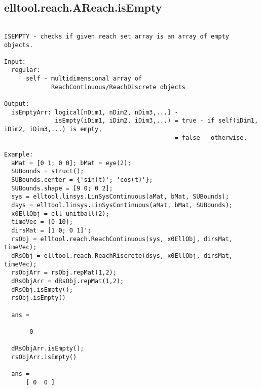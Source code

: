 \subsection{\texorpdfstring{elltool.reach.AReach.isEmpty}{isEmpty}}\label{method:elltool.reach.AReach.isEmpty}
\begin{verbatim}

ISEMPTY - checks if given reach set array is an array of empty objects.

Input:
  regular:
      self - multidimensional array of
             ReachContinuous/ReachDiscrete objects

Output:
  isEmptyArr: logical[nDim1, nDim2, nDim3,...] -
              isEmpty(iDim1, iDim2, iDim3,...) = true - if self(iDim1, iDim2, iDim3,...) is empty,
                                               = false - otherwise.

Example:
  aMat = [0 1; 0 0]; bMat = eye(2);
  SUBounds = struct();
  SUBounds.center = {'sin(t)'; 'cos(t)'};
  SUBounds.shape = [9 0; 0 2];
  sys = elltool.linsys.LinSysContinuous(aMat, bMat, SUBounds);
  dsys = elltool.linsys.LinSysContinuous(aMat, bMat, SUBounds);
  x0EllObj = ell_unitball(2);
  timeVec = [0 10];
  dirsMat = [1 0; 0 1]';
  rsObj = elltool.reach.ReachContinuous(sys, x0EllObj, dirsMat, timeVec);
  dRsObj = elltool.reach.ReachRiscrete(dsys, x0EllObj, dirsMat, timeVec);
  rsObjArr = rsObj.repMat(1,2);
  dRsObjArr = dRsObj.repMat(1,2);
  dRsObj.isEmpty();
  rsObj.isEmpty()

  ans =

       0

  dRsObjArr.isEmpty();
  rsObjArr.isEmpty()

  ans =
      [ 0  0 ]
\end{verbatim}
